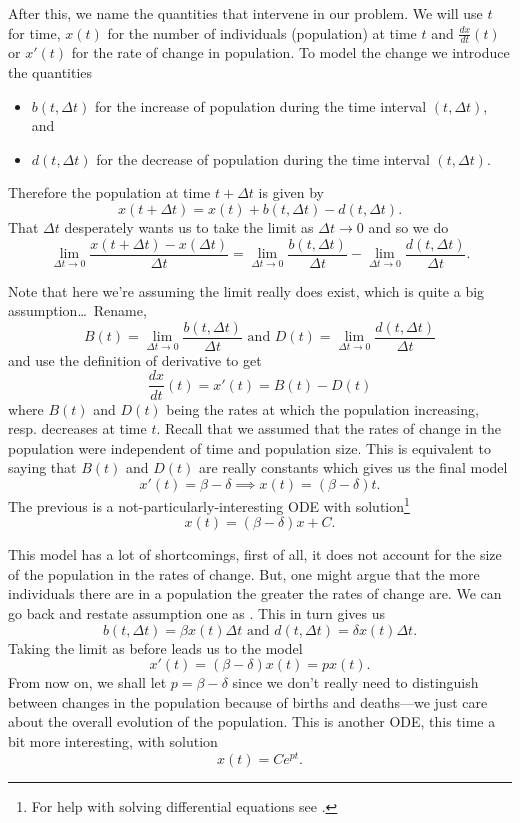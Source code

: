 After this, we name the quantities that intervene in our problem. We will use
$t$ for time, $x(t)$ for the number of individuals (population) at time $t$ and
$\frac{dx}{dt}(t)$ or $x'(t)$ for the rate of change in population. To model
the change we introduce the quantities
\begin{itemize}
  \item $b(t, \Delta t)$ for the increase of population during the time
    interval $(t, \Delta t)$, and
  \item $d(t, \Delta t)$ for the decrease of population during the time
    interval $(t, \Delta t)$.
\end{itemize}

Therefore the population at time $t + \Delta t$ is given by
\[
  x(t + \Delta t) = x(t) + b(t, \Delta t) - d(t, \Delta t).
\]
That $\Delta t$ desperately wants us to take the limit as $\Delta t \to 0$ and
so we do
\[
  \lim_{\Delta t \to 0} \frac{x(t + \Delta t) - x(\Delta t)}{\Delta t}
  = \lim_{\Delta t \to 0} \frac{b(t, \Delta t)}{\Delta t} - \lim_{\Delta t \to 0} \frac{d(t, \Delta t)}{\Delta t}.
\]

Note that here we're assuming the limit really does exist, which is quite a big
assumption\ldots\ Rename,
\[
  B(t) = \lim_{\Delta t \to 0} \frac{b(t, \Delta t)}{\Delta t} \text{ and }
  D(t) = \lim_{\Delta t \to 0} \frac{d(t, \Delta t)}{\Delta t}
\]
and use the definition of derivative to get
\[
  \frac{dx}{dt}(t) = x'(t) = B(t) - D(t)
\]
where $B(t)$ and $D(t)$ being the rates at which the population increasing,
resp. decreases at time $t$. Recall that we assumed that the rates of change in
the population were independent of time and population size. This is equivalent
to saying that $B(t)$ and $D(t)$ are really constants which gives us the final
model
\[
  x'(t) = \beta - \delta \implies x(t) = (\beta - \delta)t.
\]
The previous is a not-particularly-interesting ODE with solution\footnote{For
help with solving differential equations see \cite{math24}.}
\[
  x(t) = (\beta - \delta)x + C.
\]

This model has a lot of shortcomings, first of all, it does not account for the
size of the population in the rates of change. But, one might argue that the
more individuals there are in a population the greater the rates of change are.
We can go back and restate assumption one as .  This in turn gives us
\[
  b(t, \Delta t) = \beta x(t) \Delta t \text{ and }
  d(t, \Delta t) = \delta x(t) \Delta t.
\]
Taking the limit as before leads us to the model
\[
  x'(t) = (\beta - \delta)x(t) = px(t).
\]
From now on, we shall let $p = \beta - \delta$ since we don't really need to
distinguish between changes in the population because of births and deaths---we
just care about the overall evolution of the population. This is another ODE,
this time a bit more interesting, with solution
\[
  x(t) = C e^{p t}.
\]

